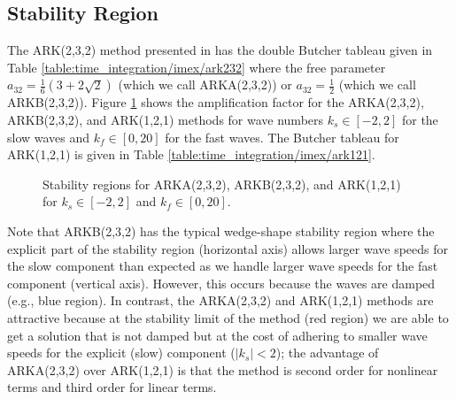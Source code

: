\documentclass{report}
\begin{document}
\subsection{Stability Region}
The ARK(2,3,2) method presented in \citep{giraldo:2013} has the double Butcher tableau given in Table \ref{table:time_integration/imex/ark232} where the free parameter $a_{32}=\frac{1}{6} \left( 3 + 2 \sqrt{2} \right)$ (which we call ARKA(2,3,2)) or $a_{32}=\frac{1}{2}$ (which we call ARKB(2,3,2)).
Figure \ref{fig:time_integration/imex_stability} shows the amplification factor for the ARKA(2,3,2), ARKB(2,3,2), and ARK(1,2,1) methods for wave numbers $k_s \in [-2,2]$ for the slow waves and $k_f \in [0,20]$ for the fast waves. The Butcher tableau for ARK(1,2,1) is given in Table \ref{table:time_integration/imex/ark121}. 
\begin{figure}[htbp]
\begin{center}
\end{center}
\caption{Stability regions for ARKA(2,3,2), ARKB(2,3,2), and ARK(1,2,1) for $k_s \in [-2,2]$ and $k_f \in [0,20]$.}
\label{fig:time_integration/imex_stability}
\end{figure}
Note that ARKB(2,3,2) has the typical wedge-shape stability region where the explicit part of the stability region (horizontal axis) allows larger wave speeds for the slow component than expected as we handle larger wave speeds for the fast component (vertical axis).  However, this occurs because the waves are damped (e.g., blue region). In contrast, the ARKA(2,3,2) and ARK(1,2,1) methods are attractive because at the stability limit of the method (red region) we are able to get a solution that is not damped but at the cost of adhering to smaller wave speeds for the explicit (slow) component ($\lvert k_s \lvert < 2$); the advantage of ARKA(2,3,2) over ARK(1,2,1) is that the method is second order for nonlinear terms and third order for linear terms.
\end{document}
